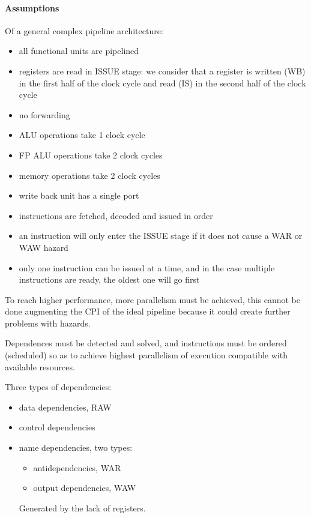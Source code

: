 \paragraph{Assumptions} Of a general complex pipeline architecture:
\begin{itemize}
    \item all functional units are pipelined
    \item registers are read in ISSUE stage: we consider that a register is written (WB) in the first half of the clock
    cycle and read (IS) in the second half of the clock cycle
    \item no forwarding
    \item ALU operations take 1 clock cycle
    \item FP ALU operations take 2 clock cycles
    \item memory operations take 2 clock cycles
    \item write back unit has a single port
    \item instructions are fetched, decoded and issued in order
    \item an instruction will only enter the ISSUE stage if it does not cause a WAR or WAW hazard
    \item only one instruction can be issued at a time, and in the case multiple instructions are ready, the oldest
    one will go first
\end{itemize}


To reach higher performance, more parallelism must be achieved, this cannot be done augmenting the CPI of the ideal
pipeline because it could create further problems with hazards.

Dependences must be detected and solved, and
instructions must be ordered (scheduled) so as to
achieve highest parallelism of execution compatible
with available resources.

Three types of dependencies:
\begin{itemize}[noitemsep]
    \item data dependencies, RAW
    \item control dependencies
    \item name dependencies, two types:
    \begin{itemize}
        \item antidependencies, WAR
        \item output dependencies, WAW
    \end{itemize}
    Generated by the lack of registers.
\end{itemize}

